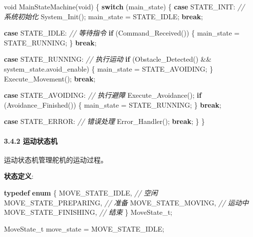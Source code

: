 \documentclass[
]{article}
\newenvironment{Shaded}{}{}
\newcommand{\CommentTok}[1]{\textcolor[rgb]{0.38,0.63,0.69}{\textit{#1}}}
\newcommand{\ControlFlowTok}[1]{\textcolor[rgb]{0.00,0.44,0.13}{\textbf{#1}}}
\newcommand{\DataTypeTok}[1]{\textcolor[rgb]{0.56,0.13,0.00}{#1}}
\newcommand{\KeywordTok}[1]{\textcolor[rgb]{0.00,0.44,0.13}{\textbf{#1}}}
\newcommand{\NormalTok}[1]{#1}
\begin{document}
\begin{Shaded}
\begin{Highlighting}[]
\DataTypeTok{void}\NormalTok{ MainStateMachine(}\DataTypeTok{void}\NormalTok{)}
\NormalTok{\{}
    \ControlFlowTok{switch}\NormalTok{ (main\_state) \{}
        \ControlFlowTok{case}\NormalTok{ STATE\_INIT:}
            \CommentTok{// 系统初始化}
\NormalTok{            System\_Init();}
\NormalTok{            main\_state = STATE\_IDLE;}
            \ControlFlowTok{break}\NormalTok{;}
            
        \ControlFlowTok{case}\NormalTok{ STATE\_IDLE:}
            \CommentTok{// 等待指令}
            \ControlFlowTok{if}\NormalTok{ (Command\_Received()) \{}
\NormalTok{                main\_state = STATE\_RUNNING;}
\NormalTok{            \}}
            \ControlFlowTok{break}\NormalTok{;}
            
        \ControlFlowTok{case}\NormalTok{ STATE\_RUNNING:}
            \CommentTok{// 执行运动}
            \ControlFlowTok{if}\NormalTok{ (Obstacle\_Detected() \&\& system\_state.avoid\_enable) \{}
\NormalTok{                main\_state = STATE\_AVOIDING;}
\NormalTok{            \}}
\NormalTok{            Execute\_Movement();}
            \ControlFlowTok{break}\NormalTok{;}
            
        \ControlFlowTok{case}\NormalTok{ STATE\_AVOIDING:}
            \CommentTok{// 执行避障}
\NormalTok{            Execute\_Avoidance();}
            \ControlFlowTok{if}\NormalTok{ (Avoidance\_Finished()) \{}
\NormalTok{                main\_state = STATE\_RUNNING;}
\NormalTok{            \}}
            \ControlFlowTok{break}\NormalTok{;}
            
        \ControlFlowTok{case}\NormalTok{ STATE\_ERROR:}
            \CommentTok{// 错误处理}
\NormalTok{            Error\_Handler();}
            \ControlFlowTok{break}\NormalTok{;}
\NormalTok{    \}}
\NormalTok{\}}
\end{Highlighting}
\end{Shaded}

\hypertarget{ux8fd0ux52a8ux72b6ux6001ux673a}{%
\paragraph{3.4.2 运动状态机}\label{ux8fd0ux52a8ux72b6ux6001ux673a}}

运动状态机管理舵机的运动过程。

\textbf{状态定义}:

\begin{Shaded}
\begin{Highlighting}[]
\KeywordTok{typedef} \KeywordTok{enum}\NormalTok{ \{}
\NormalTok{    MOVE\_STATE\_IDLE,         }\CommentTok{// 空闲}
\NormalTok{    MOVE\_STATE\_PREPARING,    }\CommentTok{// 准备}
\NormalTok{    MOVE\_STATE\_MOVING,       }\CommentTok{// 运动中}
\NormalTok{    MOVE\_STATE\_FINISHING,    }\CommentTok{// 结束}
\NormalTok{\} MoveState\_t;}

\NormalTok{MoveState\_t move\_state = MOVE\_STATE\_IDLE;}
\end{Highlighting}
\end{Shaded}
\end{document}
